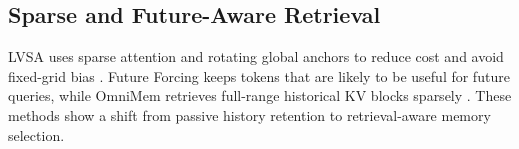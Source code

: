 \subsection{Sparse and Future-Aware Retrieval}
LVSA uses sparse attention and rotating global anchors to reduce cost and avoid fixed-grid bias \citep{lvsa2026}. Future Forcing keeps tokens that are likely to be useful for future queries, while OmniMem retrieves full-range historical KV blocks sparsely \citep{futureforcing2026,omnimem2026}. These methods show a shift from passive history retention to retrieval-aware memory selection.


